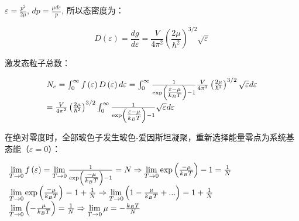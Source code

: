 $\varepsilon  = \frac{{p^2 }}{{2\mu }}$, $dp = \frac{{\mu d\varepsilon }}{p}$, 所以态密度为：

\begin{equation}\label{31-1-1}
D\left( \varepsilon  \right) = \frac{{dg}}{{d\varepsilon }} = \frac{V}{{4\pi ^2 }}\left( {\frac{{2\mu }}{{\hbar ^2 }}} \right)^{3/2} \sqrt \varepsilon
\end{equation}


激发态粒子总数：

\begin{equation}\label{31-1-2}
\begin{array}{l}
 N_e  = \int_0^\infty  {f\left( \varepsilon  \right)D\left( \varepsilon  \right)d\varepsilon }  = \int_0^\infty  {\frac{1}{{\exp \left( {{\textstyle{{\varepsilon  - \mu } \over {k_B T}}}} \right) - 1}}\frac{V}{{4\pi ^2 }}\left( {\frac{{2\mu }}{{\hbar ^2 }}} \right)^{3/2} \sqrt \varepsilon  d\varepsilon }  \\
  = \frac{V}{{4\pi ^2 }}\left( {\frac{{2\mu }}{{\hbar ^2 }}} \right)^{3/2} \int_0^\infty  {\frac{1}{{\exp \left( {{\textstyle{{\varepsilon  - \mu } \over {k_B T}}}} \right) - 1}}\sqrt \varepsilon  d\varepsilon }  \\
 \end{array}
\end{equation}

在绝对零度时，全部玻色子发生玻色-爱因斯坦凝聚，重新选择能量零点为系统基态能（$\varepsilon  = 0$）：

\begin{center}
$\begin{array}{l}
 \mathop {\lim }\limits_{T \to 0} f\left( \varepsilon  \right) = \mathop {\lim }\limits_{T \to 0} \frac{1}{{\exp \left( {{\textstyle{{ - \mu } \over {k_B T}}}} \right) - 1}} = N \Rightarrow \mathop {\lim }\limits_{T \to 0} \exp \left( {{\textstyle{{ - \mu } \over {k_B T}}}} \right) - 1 = \frac{1}{N} \\
 \mathop {\lim }\limits_{T \to 0} \exp \left( {{\textstyle{{ - \mu } \over {k_B T}}}} \right) = 1 + \frac{1}{N} \Rightarrow \mathop {\lim }\limits_{T \to 0} \left( {1 - {\textstyle{\mu  \over {k_B T}}} + ...} \right) = 1 + \frac{1}{N} \\
 \mathop {\lim }\limits_{T \to 0} \left( { - {\textstyle{\mu  \over {k_B T}}}} \right) = \frac{1}{N} \Rightarrow \mathop {\lim }\limits_{T \to 0} \mu  =  - \frac{{k_B T}}{N} \\
 \end{array}$
\end{center}



